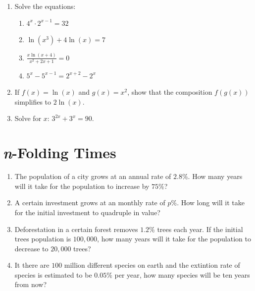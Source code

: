 \documentclass{article}
\begin{document}
\begin{enumerate}[leftmargin = 0.5cm, label = \arabic*., rightmargin = 0.2cm]
    \item Solve the equations:
    
    \begin{enumerate}[leftmargin = 0.5cm, label = (\alph*), rightmargin = 0.2cm]
    
        \item $4^x \cdot 2^{x-1} = 32$

        \item $\ln(x^3) + 4 \ln(x) = 7$

        \item $\frac{x \ln(x + 4)}{x^2 + 2x + 1} = 0$

        \item $5^x - 5^{x-1} = 2^{x+2} - 2^{x}$
    
    \end{enumerate}

    \item If $f(x) = \ln(x)$ and $g(x) = x^2$, show that the composition $f(g(x))$ simplifies to $2 \ln(x)$.

    \item Solve for $x$: $3^{2x} + 3^x = 90$.

\end{enumerate}

\section{\textit{n}-Folding Times}

\begin{enumerate}[leftmargin = 0.5cm, label = \arabic*., rightmargin = 0.2cm]

    \item The population of a city grows at an annual rate of $2.8\%$. How many years will it take for the population to increase by $75\%$?

    \item A certain investment grows at an monthly rate of $p\%$. How long will it take for the initial investment to quadruple in value?

    \item Deforestation in a certain forest removes $1.2\%$ trees each year. If the initial trees population is $100,000$, how many years will it take for the population to decrease to $20,000$ trees?

    \item It there are $100$ million different species on earth and the extintion rate of species is estimated to be $0.05\%$ per year, how many species will be ten years from now?
    
\end{enumerate}
\end{document}
